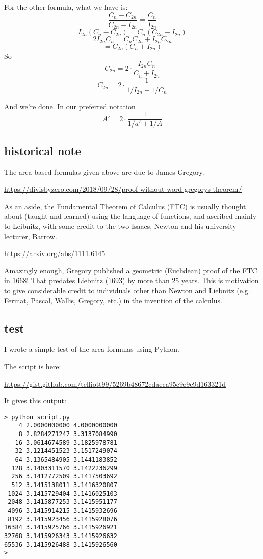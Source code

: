 \documentclass[11pt, oneside]{article}
\begin{document}
For the other formula, what we have is:
\[ \frac{C_n - C_{2n}}{C_{2n} - I_{2n}} = \frac{C_n}{I_{2n}}   \]
\[ I_{2n} (C_n - C_{2n}) = C_n (C_{2n} - I_{2n}) \]
\[ 2 I_{2n} C_n = C_n C_{2n} + I_{2n} C_{2n} \]
\[ = C_{2n}(C_{n} + I_{2n}) \]
So
\[ C_{2n}  = 2 \cdot \frac{I_{2n} C_n} {C_{n} + I_{2n}}  \]
\[ C_{2n} = 2 \cdot \frac{1}{1/I_{2n} + 1/C_n} \]

And we're done.  In our preferred notation
\[ A' = 2 \cdot \frac{1}{1/a' + 1/A} \]

\subsection*{historical note}

The area-based formulas given above are due to James Gregory.

\url{https://divisbyzero.com/2018/09/28/proof-without-word-gregorys-theorem/}

As an aside, the Fundamental Theorem of Calculus (FTC) is usually thought about (taught and learned) using the language of functions, and ascribed mainly to Leibnitz, with some credit to the two Isaacs, Newton and his university lecturer, Barrow.

\url{https://arxiv.org/abs/1111.6145}

Amazingly enough, Gregory published a geometric (Euclidean) proof of the FTC in 1668!  That predates Liebnitz (1693) by more than 25 years.  This is motivation to give considerable credit to individuals other than Newton and Liebnitz (e.g. Fermat, Pascal, Wallis, Gregory, etc.) in the invention of the calculus.

\subsection*{test}
I wrote a simple test of the area formulas using Python.

The script is here:

\url{https://gist.github.com/telliott99/5269b48672cdaeca95c9c9c9d163321d}

It gives this output:

\begin{verbatim}
> python script.py 
    4 2.0000000000 4.0000000000
    8 2.8284271247 3.3137084990
   16 3.0614674589 3.1825978781
   32 3.1214451523 3.1517249074
   64 3.1365484905 3.1441183852
  128 3.1403311570 3.1422236299
  256 3.1412772509 3.1417503692
  512 3.1415138011 3.1416320807
 1024 3.1415729404 3.1416025103
 2048 3.1415877253 3.1415951177
 4096 3.1415914215 3.1415932696
 8192 3.1415923456 3.1415928076
16384 3.1415925766 3.1415926921
32768 3.1415926343 3.1415926632
65536 3.1415926488 3.1415926560
>
\end{verbatim}
\end{document}

